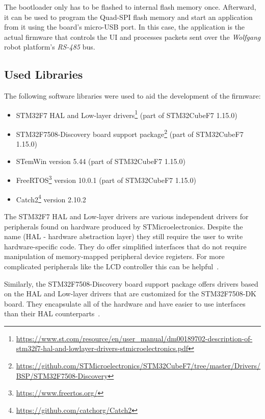 The bootloader only has to be flashed to internal flash memory once. Afterward, it can be used to
program the Quad-SPI flash memory and start an application from it using the board's micro-USB port.
In this case, the application is the actual firmware that controls the UI and processes packets
sent over the \textit{Wolfgang} robot platform's \textit{RS-485} bus.

\subsection{Used Libraries}
\label{implementation/software/used-libraries}

The following software libraries were used to aid the development of the firmware:

\begin{itemize}
    \item STM32F7 HAL and Low-layer drivers\footnote{\url{https://www.st.com/resource/en/user_manual/dm00189702-description-of-stm32f7-hal-and-lowlayer-drivers-stmicroelectronics.pdf}}
          (part of STM32CubeF7 1.15.0)
    \item STM32F7508-Discovery board support package\footnote{\url{https://github.com/STMicroelectronics/STM32CubeF7/tree/master/Drivers/BSP/STM32F7508-Discovery}}
          (part of STM32CubeF7 1.15.0)
    \item STemWin version 5.44 (part of STM32CubeF7 1.15.0)
    \item FreeRTOS\footnote{\url{https://www.freertos.org/}} version 10.0.1 (part of STM32CubeF7 1.15.0)
    \item Catch2\footnote{\url{https://github.com/catchorg/Catch2}} version 2.10.2
\end{itemize}

The STM32F7 HAL and Low-layer drivers are various independent drivers for peripherals found on
hardware produced by STMicroelectronics. Despite the name (HAL - hardware abstraction layer) they
still require the user to write hardware-specific code. They do offer simplified interfaces that do
not require manipulation of memory-mapped peripheral device registers. For more complicated peripherals
like the LCD controller this can be helpful~\cite{stm32-hal-docs}.

Similarly, the STM32F7508-Discovery board support package offers drivers based on the HAL and
Low-layer drivers that are customized for the STM32F7508-DK board. They encapsulate all of the
hardware and have easier to use interfaces than their HAL counterparts~\cite{stm32-cube-getting-started}.

